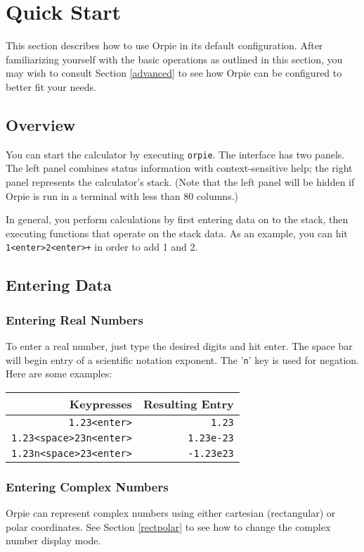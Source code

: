 \documentclass[11pt,notitlepage]{article}
\begin{document}
\section{Quick Start}
This section describes how to use Orpie in its default configuration.  After
familiarizing yourself with the basic operations as outlined in this section,
you may wish to consult Section \ref{advanced} to see how Orpie can be
configured to better fit your needs.

\subsection{Overview}
You can start the calculator by executing {\tt orpie}.  The interface has two
panels.  The left panel combines status information with context-sensitive help;
the right panel represents the calculator's stack.  (Note that the left panel
will be hidden if Orpie is run in a terminal with less than 80 columns.)

In general, you perform calculations by first entering data on to the stack,
then executing functions that operate on the stack data.  As an example, you can
hit {\tt 1<enter>2<enter>+} in order to add 1 and 2.

\subsection{Entering Data}
\subsubsection{Entering Real Numbers}
To enter a real number, just type the desired digits and hit enter.  The space
bar will begin entry of a scientific notation exponent.  The '{\tt n}' key is used
for negation.  Here are some examples:
\begin{center}
   \begin{tabular}[t]{|r|r|}
      \hline Keypresses & Resulting Entry \\
      \hline
      {\tt 1.23<enter>} & {\tt 1.23} \\
      {\tt 1.23<space>23n<enter>} & {\tt 1.23e-23} \\
      {\tt 1.23n<space>23<enter>} & {\tt -1.23e23} \\
      \hline
   \end{tabular}
\end{center}

\subsubsection{Entering Complex Numbers}
Orpie can represent complex numbers using either cartesian (rectangular) or
polar coordinates.  See Section \ref{rectpolar} to see how to change the
complex number display mode.
\end{document}
